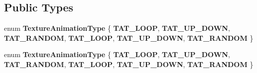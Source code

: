 \subsection*{Public Types}
\begin{DoxyCompactItemize}
\item 
\mbox{\label{classPUTextureAnimator_a6c580aab99f60ff571cbe5963494efac}} 
enum {\bfseries Texture\+Animation\+Type} \{ \newline
{\bfseries T\+A\+T\+\_\+\+L\+O\+OP}, 
{\bfseries T\+A\+T\+\_\+\+U\+P\+\_\+\+D\+O\+WN}, 
{\bfseries T\+A\+T\+\_\+\+R\+A\+N\+D\+OM}, 
{\bfseries T\+A\+T\+\_\+\+L\+O\+OP}, 
\newline
{\bfseries T\+A\+T\+\_\+\+U\+P\+\_\+\+D\+O\+WN}, 
{\bfseries T\+A\+T\+\_\+\+R\+A\+N\+D\+OM}
 \}
\item 
\mbox{\label{classPUTextureAnimator_a6c580aab99f60ff571cbe5963494efac}} 
enum {\bfseries Texture\+Animation\+Type} \{ \newline
{\bfseries T\+A\+T\+\_\+\+L\+O\+OP}, 
{\bfseries T\+A\+T\+\_\+\+U\+P\+\_\+\+D\+O\+WN}, 
{\bfseries T\+A\+T\+\_\+\+R\+A\+N\+D\+OM}, 
{\bfseries T\+A\+T\+\_\+\+L\+O\+OP}, 
\newline
{\bfseries T\+A\+T\+\_\+\+U\+P\+\_\+\+D\+O\+WN}, 
{\bfseries T\+A\+T\+\_\+\+R\+A\+N\+D\+OM}
 \}
\end{DoxyCompactItemize}
